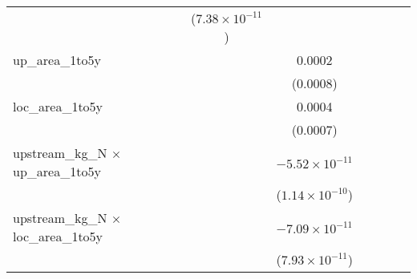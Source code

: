 \begin{tabular}{lcccccccc}
                                                  &                          &                          & ($7.38\times 10^{-11}$)  &                          &                          &                          &                          &   \\   
   up\_area\_1to5y                                &                          &                          &                          & 0.0002                   &                          &                          &                          &   \\   
                                                  &                          &                          &                          & (0.0008)                 &                          &                          &                          &   \\   
   loc\_area\_1to5y                               &                          &                          &                          & 0.0004                   &                          &                          &                          &   \\   
                                                  &                          &                          &                          & (0.0007)                 &                          &                          &                          &   \\   
   upstream\_kg\_N $\times$ up\_area\_1to5y       &                          &                          &                          & $-5.52\times 10^{-11}$   &                          &                          &                          &   \\   
                                                  &                          &                          &                          & ($1.14\times 10^{-10}$)  &                          &                          &                          &   \\   
   upstream\_kg\_N $\times$ loc\_area\_1to5y      &                          &                          &                          & $-7.09\times 10^{-11}$   &                          &                          &                          &   \\   
                                                  &                          &                          &                          & ($7.93\times 10^{-11}$)  &                          &                          &                          &   \\   

\end{tabular}

